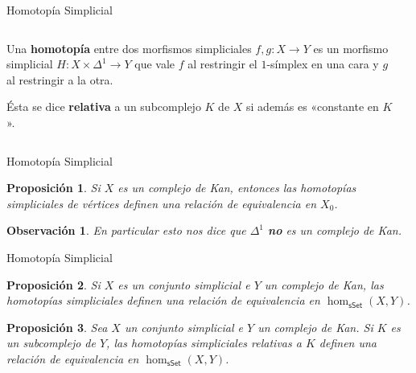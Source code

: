 \documentclass[11pt]{beamer}
\newcommand{\cat}[1]{\mathsf{#1}}
\renewcommand{\ss}[1]{\Delta^{#1}}
\newcommand{\guill}[1]{«#1»}
\newtheorem{prop}{Proposición}
\newtheorem{obs}{Observación}
\begin{document}
\begin{frame}{Homotopía Simplicial}
\begin{columns}
\begin{column}{0.5\textwidth}
\vspace{5pt}

Una \textbf{homotopía} entre dos morfismos simpliciales $f,g : X \to Y$ es un morfismo simplicial $H : X \times \ss{1} \to Y$ que vale $f$ al restringir el $1$-símplex en una cara y $g$ al restringir a la otra.
\vspace{30pt}

Ésta se dice \textbf{relativa} a un subcomplejo $K$ de $X$ si además es \guill{constante en $K$}.
\end{column} 
\begin{column}{0.5\textwidth}  \begin{center}
\end{center}
\begin{center}
\end{center}
\end{column}
\end{columns}
\end{frame}

\begin{frame}{Homotopía Simplicial}
\begin{prop} Si $X$ es un complejo de Kan, entonces las homotopías simpliciales de vértices definen una relación de equivalencia en $X_0$.
\end{prop}
\begin{obs} En particular esto nos dice que $\ss{1}$ \textbf{no} es un complejo de Kan.
\end{obs}
\end{frame}

\begin{frame}{Homotopía Simplicial}
\begin{prop} Si $X$ es un conjunto simplicial e $Y$ un complejo de Kan, las homotopías simpliciales definen una relación de equivalencia en $\hom_{\cat{sSet}}(X,Y)$.
\end{prop}
\begin{prop} Sea $X$ un conjunto simplicial e $Y$ un complejo de Kan. Si $K$ es un subcomplejo de $Y$, las homotopías simpliciales relativas a $K$ definen una relación de equivalencia en $\hom_{\cat{sSet}}(X,Y)$.
\end{prop}
\end{frame}
\end{document}

